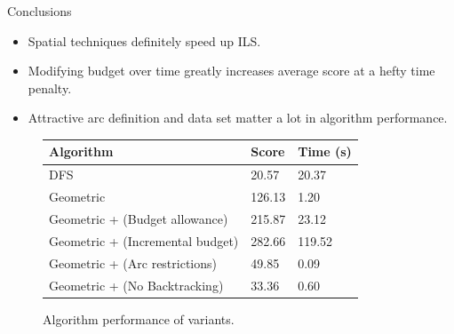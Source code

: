 \documentclass{beamer}
\begin{document}

\begin{frame}{Conclusions}
    \begin{itemize}
        \item Spatial techniques definitely speed up ILS.
        \item Modifying budget over time greatly increases average score at a hefty time penalty.
        \item Attractive arc definition and data set matter a lot in algorithm performance.
    \end{itemize}
    
    \begin{center}
    \begin{figure}
    \begin{tabular}{|l|l|l|}
    \hline
    \textbf{Algorithm} & \textbf{Score} & \textbf{Time (s)} \\
    \hline
    DFS & 20.57 & 20.37 \\
    \hline
    Geometric & 126.13 & 1.20 \\
    \hline
    Geometric + (Budget allowance) & 215.87 & 23.12 \\
    \hline
    Geometric + (Incremental budget) & 282.66 & 119.52 \\
    \hline
    Geometric + (Arc restrictions) & 49.85 & 0.09 \\
    \hline
    Geometric + (No Backtracking) & 33.36 & 0.60 \\
    \hline
    \end{tabular}
    \caption{Algorithm performance of variants.}
    \end{figure}
    \end{center}
\end{frame}
\end{document}
